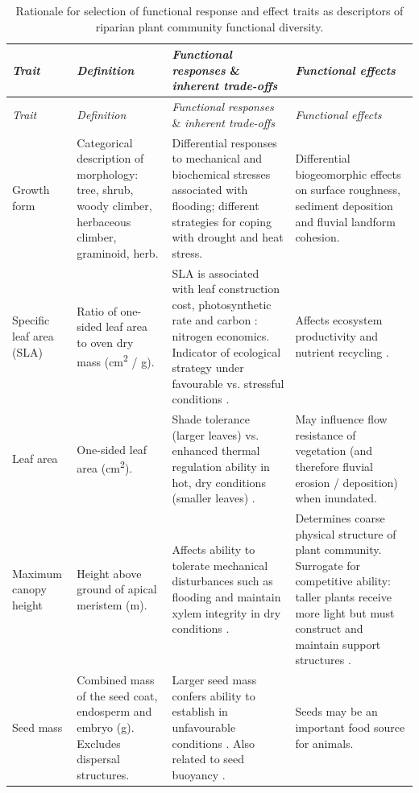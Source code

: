 \documentclass[openright,12pt,a4paper]{memoir}
\begin{document}
\begin{landscape}
\begin{tiny}
{\tabulinesep=1.2mm
\begin{longtabu} to  
\caption[Traits included in functional diversity analysis.]{Rationale for selection of functional response and effect traits as descriptors of riparian plant community functional diversity.}
\label{tab:Ch4_T2} \\
\hline
\textit{Trait} & \textit{Definition} & \textit{Functional responses} \& \textit{inherent trade-offs} & \textit{Functional effects} \\ 
%
\endfirsthead
\hline
\textit{Trait} & \textit{Definition} & \textit{Functional responses} \& \textit{inherent trade-offs} & \textit{Functional effects} \\  \hline
\endhead
\hline
Growth form & Categorical description of morphology: tree, shrub, woody climber, herbaceous climber, graminoid, herb. & Differential responses to mechanical and biochemical stresses associated with flooding; different strategies for coping with drought and heat stress. & Differential biogeomorphic effects on surface roughness, sediment deposition and fluvial landform cohesion. \\
Specific leaf area (SLA) & Ratio of one-sided leaf area to oven dry mass (cm\textsuperscript{2} / g). & SLA is associated with leaf construction cost, photosynthetic rate and carbon : nitrogen economics. Indicator of  ecological strategy under favourable vs. stressful conditions \citep{Wright2004}. & Affects ecosystem productivity and nutrient recycling \citep{Wright2004}. \\
Leaf area & One-sided leaf area (cm\textsuperscript{2}). & Shade tolerance (larger leaves) vs. enhanced thermal regulation ability in hot, dry conditions (smaller leaves) \citep{Cornelissen2003}. & May influence flow resistance of vegetation (and therefore fluvial erosion / deposition) when inundated. \\
Maximum canopy height & Height above ground of apical meristem (m). & Affects ability to tolerate mechanical disturbances such as flooding and maintain xylem integrity in dry conditions \citep{Westoby2006}. & Determines coarse physical structure of plant community. Surrogate for competitive ability: taller plants receive more light but must construct and maintain support structures \citep{Falster2006}. \\ \hline
Seed mass & Combined mass of the seed coat, endosperm and embryo (g). Excludes dispersal structures. & Larger seed mass confers ability to establish in unfavourable conditions \citep{Leishman2000}. Also related to seed buoyancy \citep{Carthey2015}. & Seeds may be an important food source for animals. \\

\end{longtabu}}
\end{tiny}
\end{landscape}
\end{document}
